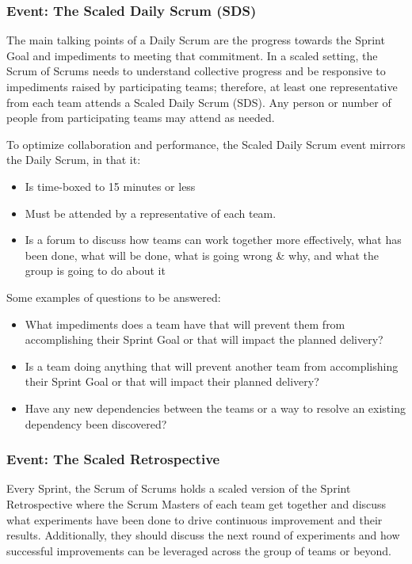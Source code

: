 \documentclass[12pt,a4paper,parskip=full]{scrartcl}
\begin{document}
\subsubsection{Event: The Scaled Daily Scrum
(SDS)}\label{event-the-scaled-daily-scrum}


The main talking points of a Daily Scrum are the progress towards the Sprint Goal and impediments to meeting that commitment. In a scaled setting, the Scrum of Scrums needs to understand collective progress and be responsive to impediments raised by participating teams; therefore, at least one representative from each team attends a Scaled Daily Scrum (SDS). Any person or number of people from participating teams may attend as needed.

To optimize collaboration and performance, the Scaled Daily Scrum event mirrors the Daily Scrum, in that it:


\begin{itemize}
\itemsep1pt\parskip0pt
\item
  Is time-boxed to 15 minutes or less
\item
  Must be attended by a representative of each team.
\item
  Is a forum to discuss how teams can work together more effectively,
  what has been done, what will be done, what is going wrong \& why, and
  what the group is going to do about it
\end{itemize}

Some examples of questions to be answered:

\begin{itemize}
\itemsep1pt\parskip0pt
\item
  What impediments does a team have that will prevent them from accomplishing their Sprint Goal or that will impact the planned delivery?
\item
  Is a team doing anything that will prevent another team from accomplishing their Sprint Goal or that will impact their planned delivery?
\item
 Have any new dependencies between the teams or a way to resolve an existing dependency been discovered?
\end{itemize}

\subsubsection{Event: The Scaled
Retrospective}\label{event-the-scaled-retrospective}

Every Sprint, the Scrum of Scrums holds a scaled version of the Sprint Retrospective where the Scrum Masters of each team get together and discuss what experiments have been done to drive continuous improvement and their results. Additionally, they should discuss the next round of experiments and how successful improvements can be leveraged across the group of teams or beyond.
\end{document}
